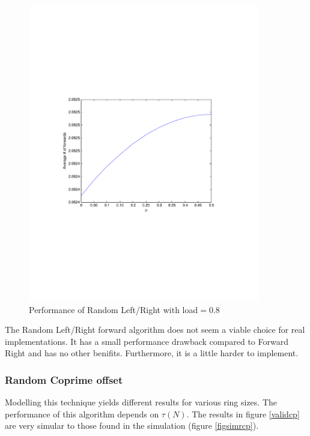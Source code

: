 \documentclass[10pt,a4paper]{article}
\begin{document}
\begin{figure}[h!tb]
\centering
\includegraphics[clip=true, trim=9em 24em 9em 24em, width=0.9\textwidth]{resources/plotrandlrp.pdf}
\caption{Performance of Random Left/Right with load$=0.8$}
\label{validrlrp}
\end{figure}

The Random Left/Right forward algorithm does not seem a viable choice for real implementations. It has a small performance drawback compared to Forward Right and has no other benifits. Furthermore, it is a little harder to implement.

\subsubsection*{Random Coprime offset}
Modelling this technique yields different results for various ring sizes. The performance of this algorithm depends on $\tau(N)$. The results in figure \ref{validcp} are very simular to those found in the simulation (figure \ref{figsimrcp}).
\end{document}
